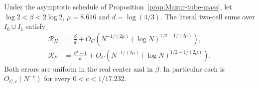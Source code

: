 \begin{corollary}
\label{cor:Mazur-intrinsic-centers}
Under the asymptotic schedule of
Proposition~\ref{prop:Mazur-tube-mass}, let
$\log2<\beta<2\log2$, $\mu=8.616$ and $d=\log(4/3)$.
The literal two-cell sums over $I_0\cup I_1$ satisfy
\begin{align}
 \mathcal R_H&=\frac{\beta}{d}
       +O_C\!\left(N^{-1/(2\mu)}
                         (\log N)^{1/2-1/(2\mu)}\right),\\
 \mathcal R_F&=\frac{e^\beta-1}{d}
       +O_C\!\left(N^{-1/(2\mu)}
                         (\log N)^{1/2-1/(2\mu)}\right).
 \label{eq:Mazur-intrinsic-centers}
\end{align}
Both errors are uniform in the real center and in $\beta$.
In particular each is $O_{C,c}(N^{-c})$ for every
$0<c<1/17.232$.
\end{corollary}
